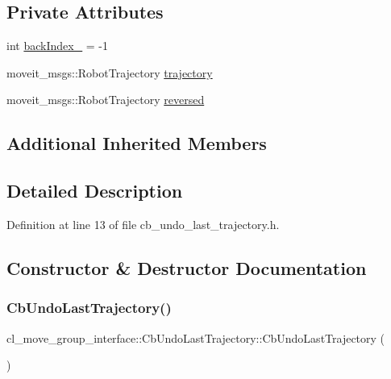 \subsection*{Private Attributes}
\begin{DoxyCompactItemize}
\item 
int \hyperlink{classcl__move__group__interface_1_1CbUndoLastTrajectory_a07b581e873b30625f06aea437a126d29}{back\+Index\+\_\+} = -\/1
\item 
moveit\+\_\+msgs\+::\+Robot\+Trajectory \hyperlink{classcl__move__group__interface_1_1CbUndoLastTrajectory_ad1fbe6bea21a14596b5c4a6ebf4c775b}{trajectory}
\item 
moveit\+\_\+msgs\+::\+Robot\+Trajectory \hyperlink{classcl__move__group__interface_1_1CbUndoLastTrajectory_ad61c8810d7f31a22f3d75251887938a8}{reversed}
\end{DoxyCompactItemize}
\subsection*{Additional Inherited Members}


\subsection{Detailed Description}


Definition at line 13 of file cb\+\_\+undo\+\_\+last\+\_\+trajectory.\+h.



\subsection{Constructor \& Destructor Documentation}
\mbox{\label{classcl__move__group__interface_1_1CbUndoLastTrajectory_a34c62fa8199c8f6f748096d6dfb51501}} 
\subsubsection{\texorpdfstring{Cb\+Undo\+Last\+Trajectory()}{CbUndoLastTrajectory()}\hspace{0.1cm}{\footnotesize\ttfamily [1/2]}}
{\footnotesize\ttfamily cl\+\_\+move\+\_\+group\+\_\+interface\+::\+Cb\+Undo\+Last\+Trajectory\+::\+Cb\+Undo\+Last\+Trajectory (\begin{DoxyParamCaption}{ }\end{DoxyParamCaption})}



